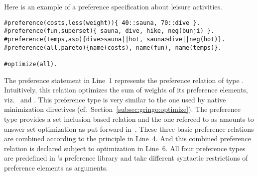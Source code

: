 Here is an example of a {preference specification} about leisure activities.
\begin{lstlisting}[escapechar=?]
#preference(costs,less(weight)){ 40::sauna, 70::dive }.
#preference(fun,superset){ sauna, dive, hike, neg(bunji) }.
#preference(temps,aso){dive>sauna||hot, sauna>dive||neg(hot)}.
#preference(all,pareto){name(costs), name(fun), name(temps)}.

#optimize(all).
\end{lstlisting}
The preference statement in Line~1 represents the preference relation  of type .
Intuitively, this relation optimizes the sum of weights of its preference elements, 
viz.\  and .
This preference type is very similar to the one used by native minimization directives (cf.\ Section~\ref{subsec:gringo:optimize}).
The preference type  provides a set inclusion based relation and the one refereed to as 
amounts to answer set optimization as put forward in~\cite{brnitr03a}.
These three basic preference relations are combined according to the  principle in Line~4.
And this combined preference relation is declared subject to optimization in Line~6.
%
All four preference types are predefined in \asprin's preference library and take different syntactic restrictions of preference elements as arguments.


